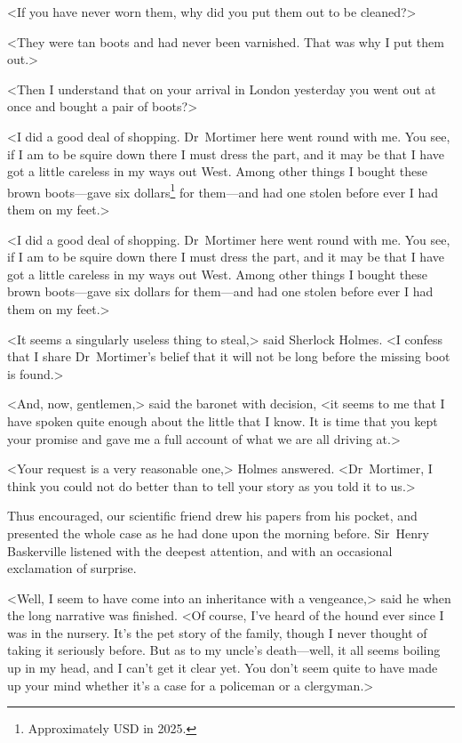 <If you have never worn them, why did you put them out to be cleaned?>

<They were tan boots and had never been varnished. That was why I put them out.>

<Then I understand that on your arrival in London yesterday you went out at once and bought a pair of boots?>

\begin{withfootnotes}
<I did a good deal of shopping. Dr~Mortimer here went round with me. You see, if I am to be squire down there I must dress the part, and it may be that I have got a little careless in my ways out West. Among other things I bought these brown boots—gave six dollars\footnote{Approximately  USD in 2025.} for them—and had one stolen before ever I had them on my feet.>
\end{withfootnotes}

\begin{withoutfootnotes}
<I did a good deal of shopping. Dr~Mortimer here went round with me. You see, if I am to be squire down there I must dress the part, and it may be that I have got a little careless in my ways out West. Among other things I bought these brown boots—gave six dollars for them—and had one stolen before ever I had them on my feet.>
\end{withoutfootnotes}

<It seems a singularly useless thing to steal,> said Sherlock Holmes. <I confess that I share Dr~Mortimer's belief that it will not be long before the missing boot is found.>

<And, now, gentlemen,> said the baronet with decision, <it seems to me that I have spoken quite enough about the little that I know. It is time that you kept your promise and gave me a full account of what we are all driving at.>

<Your request is a very reasonable one,> Holmes answered. <Dr~Mortimer, I think you could not do better than to tell your story as you told it to us.>

Thus encouraged, our scientific friend drew his papers from his pocket, and presented the whole case as he had done upon the morning before. Sir~Henry Baskerville listened with the deepest attention, and with an occasional exclamation of surprise.

<Well, I seem to have come into an inheritance with a vengeance,> said he when the long narrative was finished. <Of course, I've heard of the hound ever since I was in the nursery. It's the pet story of the family, though I never thought of taking it seriously before. But as to my uncle's death—well, it all seems boiling up in my head, and I can't get it clear yet. You don't seem quite to have made up your mind whether it's a case for a policeman or a clergyman.>

